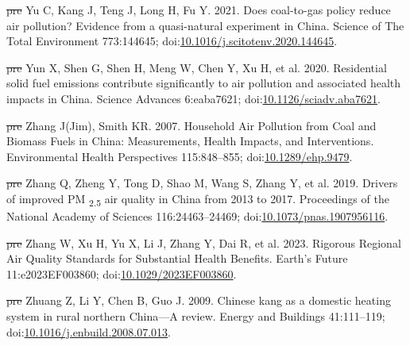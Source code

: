 \documentclass[
  letterpaper,
  DIV=11,
  numbers=noendperiod]{scrartcl}
\newlength{\cslhangindent}
\newenvironment{CSLReferences}[2] %
 {\begin{list}{}{%
  \setlength{\itemindent}{0pt} %
  \setlength{\leftmargin}{0pt} %
  \setlength{\parsep}{0pt} %
  \ifodd #1
   \setlength{\leftmargin}{\cslhangindent} %
   \setlength{\itemindent}{-1\cslhangindent} %
  \fi
  \setlength{\itemsep}{#2\baselineskip}}} %
 {\end{list}} %
\providecommand{\DIFdeltex}[1]{{\protect\color{red}\sout{#1}}}                      %
\providecommand{\DIFaddbegin}{} %
\providecommand{\DIFaddend}{} %
\providecommand{\DIFdelbegin}{} %
\providecommand{\DIFdelend}{} %
\providecommand{\DIFdel}[1]{\texorpdfstring{\DIFdeltex{#1}}{}} %
\newcommand{\DIFscaledelfig}{0.5}
\newlength{\DIFdelgraphicswidth} %
\newlength{\DIFdelgraphicsheight} %
\newcommand{\DIFaddincludegraphics}[2][]{{\color{blue}\fbox{\DIFOincludegraphics[#1]{#2}}}} %
\newcommand{\DIFdelincludegraphics}[2][]{%
\sbox{\DIFdelgraphicsbox}{\DIFOincludegraphics[#1]{#2}}%
\settoboxwidth{\DIFdelgraphicswidth}{\DIFdelgraphicsbox} %
\settoboxtotalheight{\DIFdelgraphicsheight}{\DIFdelgraphicsbox} %
\scalebox{\DIFscaledelfig}{%
\parbox[b]{\DIFdelgraphicswidth}{\usebox{\DIFdelgraphicsbox}\\[-\baselineskip] \rule{\DIFdelgraphicswidth}{0em}}\llap{\resizebox{\DIFdelgraphicswidth}{\DIFdelgraphicsheight}{%
\setlength{\unitlength}{\DIFdelgraphicswidth}%
\begin{picture}(1,1)%
\thicklines\linethickness{2pt} %
{\color[rgb]{1,0,0}\put(0,0){\framebox(1,1){}}}%
{\color[rgb]{1,0,0}\put(0,0){\line( 1,1){1}}}%
{\color[rgb]{1,0,0}\put(0,1){\line(1,-1){1}}}%
\end{picture}%
}\hspace*{3pt}}} %
} %
\DeclareRobustCommand{\DIFaddbegin}{\DIFOaddbegin \let\includegraphics\DIFaddincludegraphics} %
\DeclareRobustCommand{\DIFaddend}{\DIFOaddend \let\includegraphics\DIFOincludegraphics} %
\DeclareRobustCommand{\DIFdelbegin}{\DIFOdelbegin \let\includegraphics\DIFdelincludegraphics} %
\DeclareRobustCommand{\DIFdelend}{\DIFOaddend \let\includegraphics\DIFOincludegraphics} %
\begin{document}
\begin{CSLReferences}{1}{1}
\DIFdelbegin %
\DIFdel{pre}%
\DIFdelend \DIFaddbegin {}
\DIFaddend Yu C, Kang J, Teng J, Long H, Fu Y. 2021. Does coal-to-gas policy reduce
air pollution? {Evidence} from a quasi-natural experiment in {China}.
Science of The Total Environment 773:144645;
doi:\href{https://doi.org/10.1016/j.scitotenv.2020.144645}{10.1016/j.scitotenv.2020.144645}.

\DIFdelbegin %
\DIFdel{pre}%
\DIFdelend \DIFaddbegin {}
\DIFaddend Yun X, Shen G, Shen H, Meng W, Chen Y, Xu H, et al. 2020. Residential
solid fuel emissions contribute significantly to air pollution and
associated health impacts in {China}. Science Advances 6:eaba7621;
doi:\href{https://doi.org/10.1126/sciadv.aba7621}{10.1126/sciadv.aba7621}.

\DIFdelbegin %
\DIFdel{pre}%
\DIFdelend \DIFaddbegin {}
\DIFaddend Zhang J(Jim), Smith KR. 2007. Household {Air Pollution} from {Coal} and
{Biomass Fuels} in {China}: {Measurements}, {Health Impacts}, and
{Interventions}. Environmental Health Perspectives 115:848--855;
doi:\href{https://doi.org/10.1289/ehp.9479}{10.1289/ehp.9479}.

\DIFdelbegin %
\DIFdel{pre}%
\DIFdelend \DIFaddbegin {}
\DIFaddend Zhang Q, Zheng Y, Tong D, Shao M, Wang S, Zhang Y, et al. 2019. Drivers
of improved {PM} {\textsubscript{2.5}} air quality in {China} from 2013
to 2017. Proceedings of the National Academy of Sciences
116:24463--24469;
doi:\href{https://doi.org/10.1073/pnas.1907956116}{10.1073/pnas.1907956116}.

\DIFdelbegin %
\DIFdel{pre}%
\DIFdelend \DIFaddbegin {}
\DIFaddend Zhang W, Xu H, Yu X, Li J, Zhang Y, Dai R, et al. 2023. Rigorous
{Regional Air Quality Standards} for {Substantial Health Benefits}.
Earth's Future 11:e2023EF003860;
doi:\href{https://doi.org/10.1029/2023EF003860}{10.1029/2023EF003860}.

\DIFdelbegin %
\DIFdel{pre}%
\DIFdelend \DIFaddbegin {}
\DIFaddend Zhuang Z, Li Y, Chen B, Guo J. 2009. Chinese kang as a domestic heating
system in rural northern {China}---{A} review. Energy and Buildings
41:111--119;
doi:\href{https://doi.org/10.1016/j.enbuild.2008.07.013}{10.1016/j.enbuild.2008.07.013}.


\end{CSLReferences}
\end{document}
